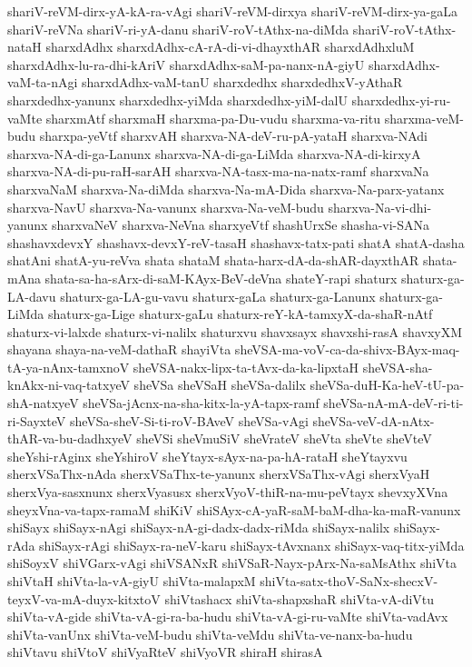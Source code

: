 {shariV-reVM-dirx-yA-kA-ra-vAgi
shariV-reVM-dirxya
shariV-reVM-dirx-ya-gaLa
shariV-reVNa
shariV-ri-yA-danu
shariV-roV-tAthx-na-diMda
shariV-roV-tAthx-nataH
sharxdAdhx
sharxdAdhx-cA-rA-di-vi-dhayxthAR
sharxdAdhxluM
sharxdAdhx-lu-ra-dhi-kAriV
sharxdAdhx-saM-pa-nanx-nA-giyU
sharxdAdhx-vaM-ta-nAgi
sharxdAdhx-vaM-tanU
sharxdedhx
sharxdedhxV-yAthaR
sharxdedhx-yanunx
sharxdedhx-yiMda
sharxdedhx-yiM-dalU
sharxdedhx-yi-ru-vaMte
sharxmAtf
sharxmaH
sharxma-pa-Du-vudu
sharxma-va-ritu
sharxma-veM-budu
sharxpa-yeVtf
sharxvAH
sharxva-NA-deV-ru-pA-yataH
sharxva-NAdi
sharxva-NA-di-ga-Lanunx
sharxva-NA-di-ga-LiMda
sharxva-NA-di-kirxyA
sharxva-NA-di-pu-raH-sarAH
sharxva-NA-tasx-ma-na-natx-ramf
sharxvaNa
sharxvaNaM
sharxva-Na-diMda
sharxva-Na-mA-Dida
sharxva-Na-parx-yatanx
sharxva-NavU
sharxva-Na-vanunx
sharxva-Na-veM-budu
sharxva-Na-vi-dhi-yanunx
sharxvaNeV
sharxva-NeVna
sharxyeVtf
shashUrxSe
shasha-vi-SANa
shashavxdevxY
shashavx-devxY-reV-tasaH
shashavx-tatx-pati
shatA
shatA-dasha
shatAni
shatA-yu-reVva
shata
shataM
shata-harx-dA-da-shAR-dayxthAR
shata-mAna
shata-sa-ha-sArx-di-saM-KAyx-BeV-deVna
shateY-rapi
shaturx
shaturx-ga-LA-davu
shaturx-ga-LA-gu-vavu
shaturx-gaLa
shaturx-ga-Lanunx
shaturx-ga-LiMda
shaturx-ga-Lige
shaturx-gaLu
shaturx-reY-kA-tamxyX-da-shaR-nAtf
shaturx-vi-lalxde
shaturx-vi-nalilx
shaturxvu
shavxsayx
shavxshi-rasA
shavxyXM
shayana
shaya-na-veM-dathaR
shayiVta
sheVSA-ma-voV-ca-da-shivx-BAyx-maq-tA-ya-nAnx-tamxnoV
sheVSA-nakx-lipx-ta-tAvx-da-ka-lipxtaH
sheVSA-sha-knAkx-ni-vaq-tatxyeV
sheVSa
sheVSaH
sheVSa-dalilx
sheVSa-duH-Ka-heV-tU-pa-shA-natxyeV
sheVSa-jAcnx-na-sha-kitx-la-yA-tapx-ramf
sheVSa-nA-mA-deV-ri-ti-ri-SayxteV
sheVSa-sheV-Si-ti-roV-BAveV
sheVSa-vAgi
sheVSa-veV-dA-nAtx-thAR-va-bu-dadhxyeV
sheVSi
sheVmuSiV
sheVrateV
sheVta
sheVte
sheVteV
sheYshi-rAginx
sheYshiroV
sheYtayx-sAyx-na-pa-hA-rataH
sheYtayxvu
sherxVSaThx-nAda
sherxVSaThx-te-yanunx
sherxVSaThx-vAgi
sherxVyaH
sherxVya-sasxnunx
sherxVyasusx
sherxVyoV-thiR-na-mu-peVtayx
shevxyXVna
sheyxVna-va-tapx-ramaM
shiKiV
shiSAyx-cA-yaR-saM-baM-dha-ka-maR-vanunx
shiSayx
shiSayx-nAgi
shiSayx-nA-gi-dadx-dadx-riMda
shiSayx-nalilx
shiSayx-rAda
shiSayx-rAgi
shiSayx-ra-neV-karu
shiSayx-tAvxnanx
shiSayx-vaq-titx-yiMda
shiSoyxV
shiVGarx-vAgi
shiVSANxR
shiVSaR-Nayx-pArx-Na-saMsAthx
shiVta
shiVtaH
shiVta-la-vA-giyU
shiVta-malapxM
shiVta-satx-thoV-SaNx-shecxV-teyxV-va-mA-duyx-kitxtoV
shiVtashacx
shiVta-shapxshaR
shiVta-vA-diVtu
shiVta-vA-gide
shiVta-vA-gi-ra-ba-hudu
shiVta-vA-gi-ru-vaMte
shiVta-vadAvx
shiVta-vanUnx
shiVta-veM-budu
shiVta-veMdu
shiVta-ve-nanx-ba-hudu
shiVtavu
shiVtoV
shiVyaRteV
shiVyoVR
shiraH
shirasA
}

